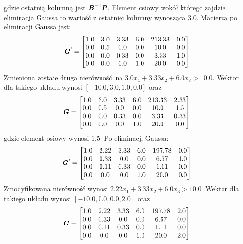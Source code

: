 gdzie ostatnią kolumną jest $\textbf{\textit{B}}^{-1} \textbf{\textit{P}}$. Element osiowy wokół którego zajdzie eliminacja Gaussa to wartość z ostatniej kolumny wynosząca $3.0$.
Macierzą po eliminacji Gaussa  jest:
\begin{equation*}
  \textbf{\textit{G\textsuperscript{'}}} =
  \begin{bmatrix}
    1.0 & 3.0 & 3.33 & 6.0 & 213.33 & 0.0 \\
    0.0 & 0.5 & 0.0 & 0.0 & 10.0 & 0.0 \\
    0.0 & 0.0 & 0.33 & 0.0 & 3.33 & 1.0 \\
    0.0 & 0.0 & 0.0 & 1.0 & 20.0 & 0.0
  \end{bmatrix}
\end{equation*}
Zmieniona zostaje druga nierówność na $3.0 x_{1}+ 3.33 x_{2}+ 6.0 x_{3} > 10.0$. Wektor  dla takiego układu wynosi $[-10.0,3.0,1.0,0.0]$ oraz
\begin{equation*}
  \textbf{\textit{G}} =
  \begin{bmatrix}
    1.0 & 3.0 & 3.33 & 6.0 & 213.33 & 2.33 \\
    0.0 & 0.5 & 0.0 & 0.0 & 10.0 & 1.5 \\
    0.0 & 0.0 & 0.33 & 0.0 & 3.33 & 0.33 \\
    0.0 & 0.0 & 0.0 & 1.0 & 20.0 & 0.0
  \end{bmatrix}
\end{equation*}
gdzie element osiowy wynosi $1.5$. Po eliminacji Gaussa:
\begin{equation*}
  \textbf{\textit{G\textsuperscript{'}}} =
  \begin{bmatrix}
    1.0 & 2.22 & 3.33 & 6.0 & 197.78 & 0.0 \\
    0.0 & 0.33 & 0.0 & 0.0 & 6.67 & 1.0 \\
    0.0 & 0.11 & 0.33 & 0.0 & 1.11 & 0.0 \\
    0.0 & 0.0 & 0.0 & 1.0 & 20.0 & 0.0
  \end{bmatrix}
\end{equation*}
Zmodyfikowana nierówność wynosi $ 2.22 x_{1}+ 3.33 x_{2}+ 6.0 x_{3} > 10.0$. Wektor  dla takiego układu wynosi $[-10.0,0.0,0.0,2.0]$ oraz
\begin{equation*}
  \textbf{\textit{G}} =
  \begin{bmatrix}
    1.0 & 2.22 & 3.33 & 6.0 & 197.78 & 2.0 \\
    0.0 & 0.33 & 0.0 & 0.0 & 6.67 & 0.0 \\
    0.0 & 0.11 & 0.33 & 0.0 & 1.11 & 0.0 \\
    0.0 & 0.0 & 0.0 & 1.0 & 20.0 & 2.0
  \end{bmatrix}
\end{equation*}
